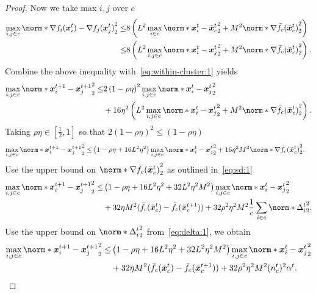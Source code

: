 \documentclass{article}
\begin{document}
\begin{proof}
    Now we take max $i,j$ over $c$
    \begin{align*}
      \max_{i,j\in c} \norm*{\nabla f_i(\xx^t_i) - \nabla f_j(\xx^t_j) }_2^2
      \le& 8 \left(L^2 \max_{i\in c} \norm*{\xx_i^t -\bar{\xx}_c^t }_2^2 + M^2 \norm*{ \nabla \bar{f}_c(\bar{\xx}^t_c) }_2^2\right) \\
      \le& 8 \left(L^2 \max_{i,j\in c} \norm*{\xx_i^t -\xx_j^t }_2^2 + M^2 \norm*{ \nabla \bar{f}_c(\bar{\xx}^t_c) }_2^2\right).
    \end{align*}
    Combine the above inequality with~\eqref{eq:within-cluster:1} yields
    \begin{align*}
      \max_{i,j\in c} \norm*{\xx_i^{t+1} - \xx_j^{t+1}}_2^2 
      \le& 2 \left(1 - \rho\eta  \right)^2 \max_{i,j\in c} \norm*{ \xx_i^t - \xx_j^t}_2^2 \\
      &+ 16\eta^2 \left( L^2 \max_{i,j\in c} \norm*{\xx_i^t -\xx_j^t }_2^2 + M^2 \norm*{ \nabla \bar{f}_c(\bar{\xx}^t_c) }_2^2\right).
    \end{align*}
    Taking $\rho\eta  \in [\frac{1}{2}, 1]$ so that $2(1-\rho\eta )^2\le (1-\rho\eta )$
    \begin{align*}
      \max_{i,j\in c} \norm*{\xx_i^{t+1} - \xx_j^{t+1}}_2^2 
      \le& \left(1 - \rho\eta  + 16L^2\eta^2 \right) \max_{i,j\in c} \norm*{ \xx_i^t - \xx_j^t}_2^2 + 16\eta^2  M^2 \norm*{ \nabla \bar{f}_c(\bar{\xx}^t_c) }_2^2.
    \end{align*}
    Use the upper bound on $\norm*{ \nabla \bar{f}_c(\bar{\xx}^t_c) }_2^2$ as outlined in~\eqref{eq:sd:1}
    \begin{align*}
      \max_{i,j\in c} \norm*{\xx_i^{t+1} - \xx_j^{t+1}}_2^2 
      \le& \left(1 -\rho\eta + 16L^2\eta^2 + 32L^2\eta^2M^2 \right) \max_{i,j\in c} \norm*{ \xx_i^t - \xx_j^t}_2^2  \\
      & + 32\eta M^2(\bar{f}_c(\bar{\xx}_c^{t}) - \bar{f}_c(\bar{\xx}_c^{t+1}))
      + 32\rho^2 \eta^2M^2 \frac{1}{c} \sum_{i\in c}\norm*{ \Delta_i^t}_2^2.  
    \end{align*}
    Use the upper bound on $\norm*{ \Delta_i^t}_2^2$ from~\eqref{eq:delta:1}, we obtain
    \begin{align*}
      \max_{i,j\in c} \norm*{\xx_i^{t+1} - \xx_j^{t+1}}_2^2 
      \le& \left(1 -\rho\eta + 16L^2\eta^2 + 32L^2\eta^2M^2\right) \max_{i,j\in c} \norm*{ \xx_i^t - \xx_j^t}_2^2  \\
      &+ 32\eta M^2(\bar{f}_c(\bar{\xx}_c^{t}) - \bar{f}_c(\bar{\xx}_c^{t+1})) 
      + 32\rho^2 \eta^2M^2  (n_c^t)^2\alpha^t.  
    \end{align*}

\end{proof}
\end{document}
